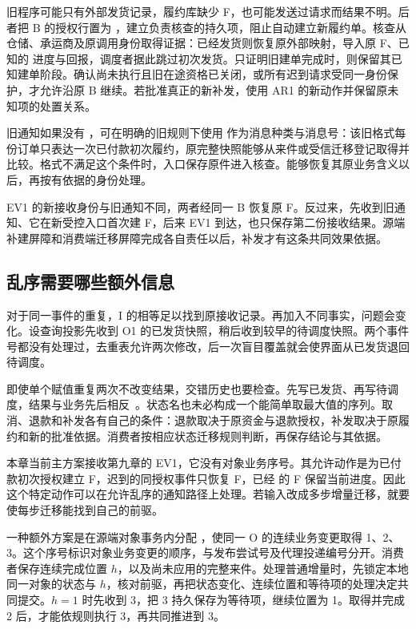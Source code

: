 旧程序可能只有外部发货记录，履约库缺少 F，也可能发送过请求而结果不明。后者把 B 的授权行置为 ，建立负责核查的持久项，阻止自动建立新履约单。核查从仓储、承运商及原调用身份取得证据：已经发货则恢复原外部映射，导入原 F、已知的  进度与回报，调度者据此跳过初次发货。只证明旧建单完成时，则保留其已知建单阶段。确认尚未执行且旧在途资格已关闭，或所有迟到请求受同一身份保护，才允许沿原 B 继续。若批准真正的新补发，使用 AR1 的新动作并保留原未知项的处置关系。

旧通知如果没有 ，可在明确的旧规则下使用  作为消息种类与消息号：该旧格式每份订单只表达一次已付款初次履约，原完整快照能够从来件或受信迁移登记取得并比较。格式不满足这个条件时，入口保存原件进入核查。能够恢复其原业务含义以后，再按有依据的身份处理。

EV1 的新接收身份与旧通知不同，两者经同一 B 恢复原 F。反过来，先收到旧通知、它在新受控入口首次建 F，后来 EV1 到达，也只保存第二份接收结果。源端补建屏障和消费端迁移屏障完成各自责任以后，补发才有这条共同效果依据。


\subsection*{乱序需要哪些额外信息}

对于同一事件的重复，I 的相等足以找到原接收记录。再加入不同事实，问题会变化。设查询投影先收到 O1 的已发货快照，稍后收到较早的待调度快照。两个事件号都没有处理过，去重表允许两次修改，后一次盲目覆盖就会使界面从已发货退回待调度。

即使单个赋值重复两次不改变结果，交错历史也要检查。先写已发货、再写待调度，结果与业务先后相反~\cite{handling-duplicate-messages}。状态名也未必构成一个能简单取最大值的序列。取消、退款和补发各有自己的条件：退款取决于原资金与退款授权，补发取决于原履约和新的批准依据。消费者按相应状态迁移规则判断，再保存结论与其依据。

本章当前主方案接收第九章的 EV1，它没有对象业务序号。其允许动作是为已付款初次授权建立 F，迟到的同授权事件只恢复 F，已经  的 F 保留当前进度。因此这个特定动作可以在允许乱序的通知路径上处理。若输入改成多步增量迁移，就要使每步迁移能找到自己的前驱。

一种额外方案是在源端对象事务内分配 ，使同一 O 的连续业务变更取得 1、2、3。这个序号标识对象业务变更的顺序，与发布尝试号及代理投递编号分开。消费者保存连续完成位置 \(h\)，以及尚未应用的完整来件。处理普通增量时，先锁定本地同一对象的状态与 \(h\)，核对前驱，再把状态变化、连续位置和等待项的处理决定共同提交。\(h=1\) 时先收到 3，把 3 持久保存为等待项，继续位置为 1。取得并完成 2 后，才能依规则执行 3，再共同推进到 3。

